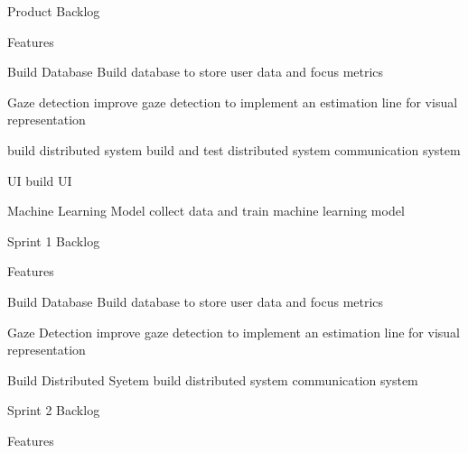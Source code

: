 \documentclass[12pt]{article}
\begin{document}
\begin{sectionbox}[colback=white]{Product Backlog}
\begin{subsectionbox}[colback=white]{Features}
\begin{featurebox}[colback=white]{Build Database}
Build database to store user data and focus metrics
\end{featurebox}
\begin{featurebox}[colback=white]{Gaze detection}
improve gaze detection to implement an estimation line for visual representation
\end{featurebox}
\begin{featurebox}[colback=white]{build distributed system}
build and test distributed system communication system
\end{featurebox}
\begin{featurebox}[colback=white]{UI}
build UI
\end{featurebox}
\begin{featurebox}[colback=white]{Machine Learning Model}
collect data and train machine learning model
\end{featurebox}
\end{subsectionbox}
\end{sectionbox}

\begin{sectionbox}[colback=white]{Sprint 1 Backlog}
\begin{subsectionbox}[colback=white]{Features}
\begin{featurebox}[colback=white]{Build Database}
Build database to store user data and focus metrics
\end{featurebox}
\begin{featurebox}[colback=white]{Gaze Detection}
improve gaze detection to implement an estimation line for visual representation
\end{featurebox}
\begin{featurebox}[colback=white]{Build Distributed Syetem}
build distributed system communication system
\end{featurebox}
\end{subsectionbox}
\end{sectionbox}

\begin{sectionbox}[colback=white]{Sprint 2 Backlog}
\begin{subsectionbox}[colback=white]{Features}
\begin{featurebox}[colback=white]{}

\end{featurebox}
\begin{featurebox}[colback=white]{}

\end{featurebox}
\begin{featurebox}[colback=white]{}

\end{featurebox}
\end{subsectionbox}
\end{sectionbox}
\end{document}
